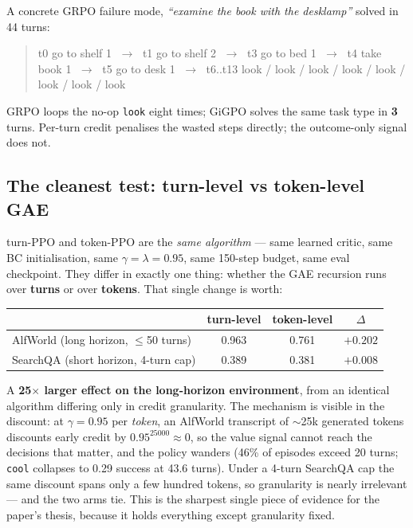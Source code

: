 \documentclass[11pt]{article}
\newcommand{\good}[1]{\textcolor{green!45!black}{#1}}
\newcommand{\bad}[1]{\textcolor{red!70!black}{#1}}
\begin{document}
A concrete GRPO failure mode, \emph{``examine the book with the desklamp''} solved in 44 turns:
\begin{quote}\ttfamily\small
t0 go to shelf 1 $\;\to\;$ t1 go to shelf 2 $\;\to\;$ t3 go to bed 1 $\;\to\;$ t4 take book 1
$\;\to\;$ t5 go to desk 1 $\;\to\;$ \bad{t6..t13 look / look / look / look / look / look / look / look}
\end{quote}
GRPO loops the no-op \texttt{look} eight times; GiGPO solves the same task type in \textbf{3} turns.
Per-turn credit penalises the wasted steps directly; the outcome-only signal does not.

\subsection*{The cleanest test: turn-level vs token-level GAE}
turn-PPO and token-PPO are the \emph{same algorithm} --- same learned critic, same BC initialisation,
same $\gamma{=}\lambda{=}0.95$, same 150-step budget, same eval checkpoint. They differ in exactly one
thing: whether the GAE recursion runs over \textbf{turns} or over \textbf{tokens}. That single change
is worth:
\begin{center}\small
\begin{tabular}{lccc}
\toprule
& turn-level & token-level & $\Delta$\\
\midrule
AlfWorld (long horizon, $\le$50 turns) & 0.963 & 0.761 & \good{$+0.202$}\\
SearchQA (short horizon, 4-turn cap)   & 0.389 & 0.381 & $+0.008$\\
\bottomrule
\end{tabular}
\end{center}
\noindent A \textbf{25$\times$ larger effect on the long-horizon environment}, from an identical
algorithm differing only in credit granularity. The mechanism is visible in the discount: at
$\gamma{=}0.95$ per \emph{token}, an AlfWorld transcript of $\sim$25k generated tokens discounts early
credit by $0.95^{25000}\!\approx\!0$, so the value signal cannot reach the decisions that matter, and
the policy wanders (46\% of episodes exceed 20 turns; \texttt{cool} collapses to 0.29 success at 43.6
turns). Under a 4-turn SearchQA cap the same discount spans only a few hundred tokens, so
granularity is nearly irrelevant --- and the two arms tie. This is the sharpest single piece of
evidence for the paper's thesis, because it holds everything except granularity fixed.
\end{document}
